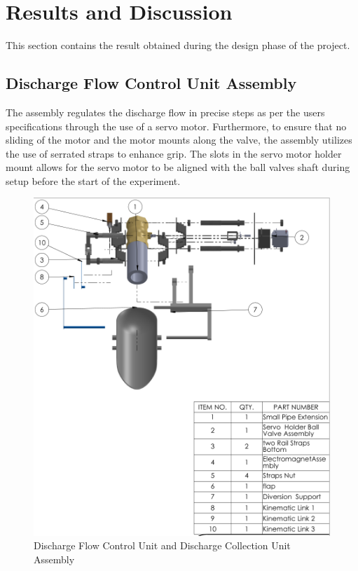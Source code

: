 \section{Results and Discussion}
\par
This section contains the result obtained during the design phase of the project.
\subsection{Discharge Flow Control Unit Assembly}
\par
The assembly regulates the discharge flow in precise steps as per the users specifications through the use of a servo motor. Furthermore, to ensure that no sliding of the motor and the motor mounts along the valve, the assembly utilizes the use of serrated straps to enhance grip. The slots in the servo motor holder mount allows for the servo motor to be aligned with the ball valves shaft during setup before the start of the experiment.
\begin{figure}[ht]
    \centering
    \includegraphics[width=\textwidth,height=0.9\textheight,keepaspectratio]{Figures/assembly.png}
    \caption{Discharge Flow Control Unit and Discharge Collection Unit Assembly}
    \label{fig:assembly}
\end{figure}
